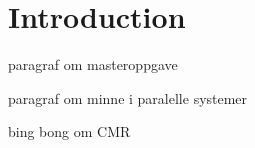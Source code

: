 \chapter{Introduction}

paragraf om masteroppgave

paragraf om minne i paralelle systemer

bing bong om CMR
